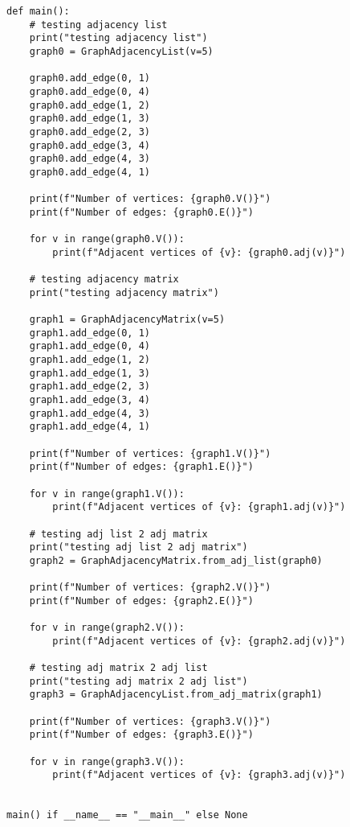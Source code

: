 \documentclass[10pt]{article}
\begin{document}
\begin{verbatim}
def main():
    # testing adjacency list
    print("testing adjacency list")
    graph0 = GraphAdjacencyList(v=5)

    graph0.add_edge(0, 1)
    graph0.add_edge(0, 4)
    graph0.add_edge(1, 2)
    graph0.add_edge(1, 3)
    graph0.add_edge(2, 3)
    graph0.add_edge(3, 4)
    graph0.add_edge(4, 3)
    graph0.add_edge(4, 1)

    print(f"Number of vertices: {graph0.V()}")
    print(f"Number of edges: {graph0.E()}")
    
    for v in range(graph0.V()):
        print(f"Adjacent vertices of {v}: {graph0.adj(v)}")

    # testing adjacency matrix
    print("testing adjacency matrix")

    graph1 = GraphAdjacencyMatrix(v=5)
    graph1.add_edge(0, 1)
    graph1.add_edge(0, 4)
    graph1.add_edge(1, 2)
    graph1.add_edge(1, 3)
    graph1.add_edge(2, 3)
    graph1.add_edge(3, 4)
    graph1.add_edge(4, 3)
    graph1.add_edge(4, 1)

    print(f"Number of vertices: {graph1.V()}")
    print(f"Number of edges: {graph1.E()}")

    for v in range(graph1.V()):
        print(f"Adjacent vertices of {v}: {graph1.adj(v)}")

    # testing adj list 2 adj matrix
    print("testing adj list 2 adj matrix")
    graph2 = GraphAdjacencyMatrix.from_adj_list(graph0)

    print(f"Number of vertices: {graph2.V()}")
    print(f"Number of edges: {graph2.E()}")

    for v in range(graph2.V()):
        print(f"Adjacent vertices of {v}: {graph2.adj(v)}")

    # testing adj matrix 2 adj list
    print("testing adj matrix 2 adj list")
    graph3 = GraphAdjacencyList.from_adj_matrix(graph1)

    print(f"Number of vertices: {graph3.V()}")
    print(f"Number of edges: {graph3.E()}")

    for v in range(graph3.V()):
        print(f"Adjacent vertices of {v}: {graph3.adj(v)}")


main() if __name__ == "__main__" else None
\end{verbatim}
\end{document}
